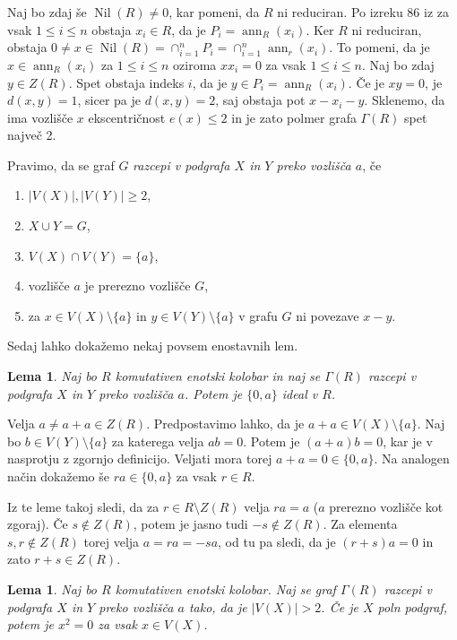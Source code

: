\documentclass[a4paper, 12pt]{amsart}
\theoremstyle{definition} %
\theoremstyle{plain} %
\newtheorem{lema}[definicija]{Lema}
\DeclareMathOperator{\ann}{ann}
\DeclareMathOperator{\nil}{Nil}
\begin{document}
Naj bo zdaj še $\nil(R)\neq 0$, kar pomeni, da $R$ ni reduciran. Po izreku 86 iz \cite{Kaplansky} za vsak $1\le i \le n$ obstaja $x_i \in R$, da je $P_i = \ann_R(x_i)$. Ker $R$ ni reduciran, obstaja $0\neq x \in \nil(R) = \cap_{i=1}^n P_i = \cap_{i=1}^n \ann_r(x_i)$. To pomeni, da je $x\in \ann_R(x_i)$ za $ 1\le i \le n$ oziroma $x x_i = 0$ za vsak $1\le i \le n$. Naj bo zdaj $y\in Z(R)$. Spet obstaja indeks $i$, da je $y\in P_i = \ann_R(x_i)$. Če je $xy =0$, je $d(x,y)=1$, sicer pa je $d(x,y) = 2$, saj obstaja pot $x - x_i - y$. Sklenemo, da ima vozlišče $x$ ekscentričnost $e(x) \le 2$ in je  zato polmer grafa $\Gamma(R)$ spet največ 2.

\endproof

Pravimo, da se graf $G$ \emph{razcepi v podgrafa $X$ in $Y$ preko vozlišča $a$}, če 
\begin{enumerate}
\item $|V(X)|,|V(Y)| \ge 2$,
\item $X\cup Y = G$,
\item $V(X) \cap V(Y) = \{a\}$,
\item vozlišče $a$ je prerezno vozlišče $G$,
\item za $x\in V(X)\setminus\{a\}$ in $y\in V(Y) \setminus \{a\}$ v grafu $G$ ni povezave $x-y$.
\end{enumerate}
Sedaj lahko dokažemo nekaj povsem enostavnih lem.

\begin{lema}
Naj bo $R$ komutativen enotski kolobar in naj se $\Gamma(R)$ razcepi v podgrafa $X$ in $Y$ preko vozlišča $a$. Potem je $\{0,a\}$ ideal v $R$.
\end{lema}

\proof
Velja $a \neq a+ a \in Z(R)$. Predpostavimo lahko, da je $a+a \in V(X) \setminus \{a\}$. Naj bo $b\in V(Y) \setminus \{a\}$ za katerega velja $ab = 0$. Potem je $(a+a)b = 0$, kar je v nasprotju z zgornjo definicijo. Veljati mora torej $a+a = 0 \in \{0,a\}$. Na analogen način dokažemo še $ra \in \{0,a\}$ za vsak $r\in R$.
\endproof

Iz te leme takoj sledi, da za $r\in R\setminus Z(R)$ velja $ra = a$ ($a$ prerezno vozlišče kot zgoraj). Če $s\notin Z(R)$, potem je jasno tudi $-s \notin Z(R)$. Za elementa $s,r\notin Z(R)$ torej velja $a=ra=-sa$, od tu pa sledi, da je $(r+s)a = 0$ in zato $r+s \in Z(R)$.

\begin{lema}
Naj bo $R$ komutativen enotski kolobar. Naj se graf $\Gamma(R)$ razcepi v podgrafa $X$ in $Y$ preko vozlišča $a$ tako, da je $|V(X)|>2$. Če je $X$ poln podgraf, potem je $x^2 = 0$ za vsak $x\in V(X)$.
\end{lema}
\end{document}
